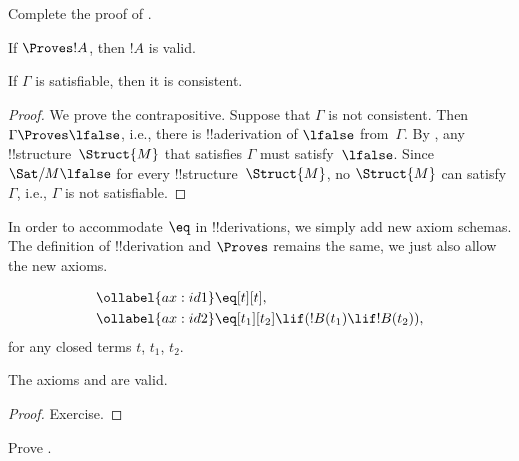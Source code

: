 \begin{prob}
  Complete the proof of .
\end{prob}


\begin{cor}
If $\Proves !A$, then $!A$ is valid.
\end{cor}

\begin{cor}
If $\Gamma$ is satisfiable, then it is consistent.
\end{cor}

\begin{proof}
We prove the contrapositive.  Suppose that $\Gamma$ is not consistent.
Then $\Gamma \Proves \lfalse$, i.e., there is !!a{derivation} of
$\lfalse$ from~$\Gamma$. By , any
!!{structure}~$\Struct{M}$
that satisfies $\Gamma$ must satisfy~$\lfalse$.  Since
$\Sat/{M}{\lfalse}$ for every
  !!{structure}~$\Struct{M}$, no
$\Struct{M}$ can satisfy $\Gamma$, i.e.,
$\Gamma$ is not satisfiable.
\end{proof}





  



In order to accommodate $\eq$ in !!{derivation}s, we simply add new
axiom schemas. The definition of !!{derivation} and $\Proves$ remains
the same, we just also allow the new axioms.

\begin{defn}
\begin{align}
\ollabel{ax:id1} & \eq[t][t], \\
\ollabel{ax:id2} & \eq[t_1][t_2] \lif (!B(t_1) \lif
  !B(t_2)),
\end{align}
for any closed terms $t$, $t_1$, $t_2$.
\end{defn}

\begin{prop}
  The axioms  and  are valid.
\end{prop}

\begin{proof}
  Exercise.
\end{proof}

\begin{prob}
Prove .
\end{prob}


